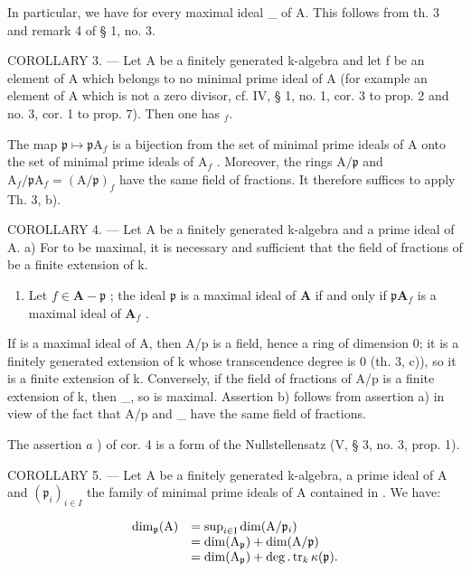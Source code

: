 In particular, we have  for every maximal ideal \_ of A. This follows from th. 3 and remark 4 of § 1, no. 3.

COROLLARY 3. --- Let A be a finitely generated k-algebra and let f be an element of A which belongs to no minimal prime ideal of A (for example an element of A which is not a zero divisor, cf. IV, § 1, no. 1, cor. 3 to prop. 2 and no. 3, cor. 1 to prop. 7). Then one has \(_{f}\).

The map \(\mathfrak{p} \mapsto \mathfrak{p}\mathrm{A}_f\) is a bijection from the set of minimal prime ideals of A onto the set of minimal prime ideals of \(\mathrm{A}_f\) . Moreover, the rings \(\mathrm{A} / \mathfrak{p}\) and \(\mathrm{A}_f / \mathfrak{p}\mathrm{A}_f = (\mathrm{A} / \mathfrak{p})_f\) have the same field of fractions. It therefore suffices to apply Th. 3, b).

COROLLARY 4. --- Let A be a finitely generated k-algebra and  a prime ideal of A. a) For  to be maximal, it is necessary and sufficient that the field of fractions of  be a finite extension of k.

\begin{enumerate}
\def\labelenumi{\alph{enumi})}
\setcounter{enumi}{1}
\tightlist
\item
  Let \(f \in \mathbf{A} - \mathfrak{p}\) ; the ideal \(\mathfrak{p}\) is a maximal ideal of \(\mathbf{A}\) if and only if \(\mathfrak{p}\mathbf{A}_f\) is a maximal ideal of \(\mathbf{A}_f\) .
\end{enumerate}

If  is a maximal ideal of A, then A/p is a field, hence a ring of dimension 0; it is a finitely generated extension of k whose transcendence degree is 0 (th. 3, c)), so it is a finite extension of k. Conversely, if the field of fractions of A/p is a finite extension of k, then \_, so  is maximal. Assertion b) follows from assertion a) in view of the fact that A/p and \_ have the same field of fractions.

The assertion \(a\) ) of cor. 4 is a form of the Nullstellensatz (V, § 3, no. 3, prop. 1).

COROLLARY 5. --- Let A be a finitely generated k-algebra,  a prime ideal of A and \((\mathfrak{p}_{i})_{i\in I}\) the family of minimal prime ideals of A contained in . We have:

\[
\begin{array}{r l} \dim_ {\mathfrak {p}} (\mathrm{A}) & = \sup _ {i \in \mathrm{I}} \dim (\mathrm{A} / \mathfrak {p} _ {i}) \\ & = \dim (\mathrm{A} _ {\mathfrak {p}}) + \dim (\mathrm{A} / \mathfrak {p}) \\ & = \dim (\mathrm{A} _ {\mathfrak {p}}) + \deg . \operatorname{tr} _ {k} \kappa (\mathfrak {p}). \end{array}
\]


